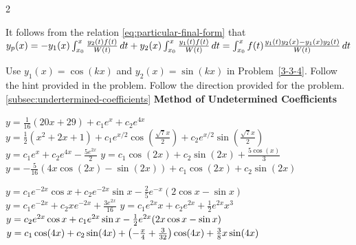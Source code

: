 \begin{multicols}{2}
\begin{Answer}[ref={EX33}]
	
		\Question \label{3-3-4a}
		It follows from the relation \eqref{eq:particular-final-form} that 
		\(y_p(x)= -y_1(x) \int_{x_0}^x \frac{y_2(t) f(t)}{W(t)} \, dt 
		+ y_2(x) \int_{x_0}^x \frac{y_1(t) f(t)}{W(t)} \, dt\\
		=\int_{x_0}^{x} f(t)\frac{y_1(t) y_2(x) - y_1(x) y_2(t)}{W(t)}\,dt\)
	
	\Question \label{3-3-5a} Use $y_1(x)= \cos(kx)$ and $y_2(x)= \sin(kx)$ in Problem~\ref{3-3-4}. 
	\Question \label{3-3-6a} Follow the hint provided in the problem.
	\Question \label{3-3-7a} Follow the direction provided for the problem.\\
	
	\hspace{-4ex}\ref{subsec:undertermined-coefficients} \textbf{Method of Undetermined Coefficients}
	\Question \label{3-3-8a}
	\begin{tasks}	
		\task \(y= \frac{1}{16} (20 x+29)+c_1 e^x+c_2 e^{4 x}\)
		\task \(y=\frac{1}{2} \left(x^2+2 x+1\right)+c_1 e^{x/2} \cos \left(\frac{\sqrt{7} x}{2}\right)+c_2 e^{x/2} \sin \left(\frac{\sqrt{7} x}{2}\right)\)
		\task \(y=c_1 e^x+c_2 e^{4 x}-\frac{5 e^{2 x}}{2}\)
		\task \(y=c_1 \cos (2 x)+c_2 \sin (2 x)+\frac{5 \cos (x)}{3}\)
		\task \(y=-\frac{5}{16} (4 x \cos (2 x)-\sin (2 x))+c_1 \cos (2 x)+c_2 \sin (2 x)\)
		
		\task \(y=c_1 e^{-2 x} \cos x+c_2 e^{-2 x} \sin x-\frac{2}{5} e^{-x} (2 \cos x-\sin x)\)
		\task \(y=c_1 e^{-2 x}+c_2 xe^{-2 x} +\frac{3 e^{2 x}}{16} \)
		\task \(y=c_1 e^{2 x} x+c_2 e^{2 x}+\frac{1}{2} e^{2 x} x^3\)
		\task \(y=c_2 e^{2 x} \cos x+c_1 e^{2 x} \sin x\\-\frac{1}{2} e^{2 x} (2 x \cos x-\sin x)\)
		\task \(y = c_1\cos(4x) +c_2\sin(4x)\\ +\left(-\frac{x}{4}+\frac{3}{32}\right) \cos (4 x)+\frac{3}{8} x \sin (4 x)\)
		

\end{tasks}
\end{Answer}
\end{multicols}
